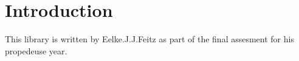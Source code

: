 \hypertarget{index_Introduction}{}\section{Introduction}\label{index_Introduction}
This library is written by Eelke.\+J.\+J.\+Feitz as part of the final assesment for his propedeuse year. 